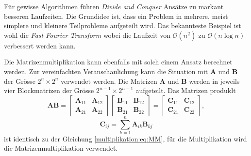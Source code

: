 F\"ur gewisse Algorithmen f\"uhren \textit{Divide and Conquer}  Ans\"atze \cite{multiplikation:DAC} zu markant besseren Laufzeiten.
Die Grundidee ist, dass ein Problem in mehrere, meist simplere und kleinere Teilprobleme aufgeteilt wird.
Das bekannteste Beispiel ist wohl die \textit{Fast Fourier Transform} wobei die Laufzeit von $\mathcal{O}\left(n^2\right)$ zu $\mathcal{O}(n \log n)$ verbessert werden kann.

Die Matrizenmultiplikation kann ebenfalls mit solch einem Ansatz berechnet werden.
Zur vereinfachten Veranschaulichung kann die Situation mit $\mathbf{A}$ und $\mathbf{B}$ der Gr\"osse $2^n \times 2^n$ verwendet werden.
Die Matrizen $\mathbf{A}$ und $\mathbf{B}$ werden in jeweils vier Blockmatrizen der Gr\"osse $2^{n-1} \times 2^{n-1}$ aufgeteilt.
Das Matrizen produklt
\begin{equation}
\mathbf{A}\mathbf{B}=
\begin{bmatrix}
\mathbf{A}_{11} & \mathbf{A}_{12}\\
\mathbf{A}_{21} & \mathbf{A}_{22}
\end{bmatrix}
\begin{bmatrix}
\mathbf{B}_{11} & \mathbf{B}_{12}\\
\mathbf{B}_{21} & \mathbf{B}_{22}
\end{bmatrix}
=
\begin{bmatrix}
\mathbf{C}_{11} & \mathbf{C}_{12}\\
\mathbf{C}_{21} & \mathbf{C}_{22}
\end{bmatrix},
\end{equation}
\begin{equation}
\mathbf{C}_{ij} = \sum_{k=1}^n \mathbf{A}_{ik} \mathbf{B}_{kj}
\label{multiplikation:eq:MM_block}
\end{equation}
ist identisch zu der Gleichung \eqref{multiplikation:eq:MM}, f\"ur die Multiplikation wird die Matrizenmultiplikation verwendet.

